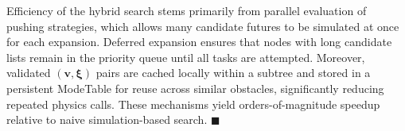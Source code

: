 \begin{remark}\label{remark:simloop}
Efficiency of the hybrid search stems primarily from parallel evaluation of
pushing strategies, which allows many candidate futures to be simulated at once
for each expansion. Deferred expansion ensures that nodes with long candidate
lists remain in the priority queue until all tasks are attempted.
Moreover, validated $(\mathbf{v},\boldsymbol{\xi})$ pairs
are cached locally within a subtree and stored in a persistent ModeTable for
reuse across similar obstacles, significantly reducing repeated physics calls.
These mechanisms yield orders-of-magnitude speedup relative to naive
simulation-based search. \hfill$\blacksquare$
\end{remark}
